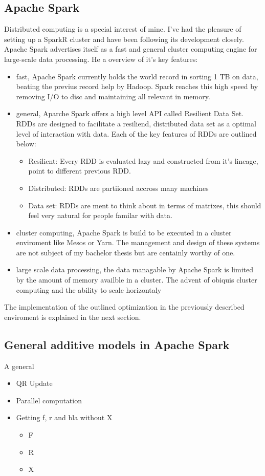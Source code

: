 \message{ !name(expose.tex)}\documentclass{article}
\begin{document}
    \subsection{Apache Spark}
    Distributed computing is a special interest of mine. I've had the pleasure of setting up a SparkR cluster and have been following its development closely. Apache Spark advertises itself as a fast and general cluster computing engine for large-scale data processing. He a overview of it's key features:
    \begin{itemize}
        \item fast, Apache Spark currently holds the world record in sorting 1 TB on data, beating the previus record help by Hadoop. Spark reaches this high speed by removing I/O to disc and maintaining all relevant in memory.
        \item general, Aparche Spark offers a high level API called Resilient Data Set. RDDs are designed to facilitate a resiliend, distributed data set as a optimal level of interaction with data. Each of the key features of RDDs are outlined below:
        \begin{itemize}
            \item Resilient: Every RDD is evaluated lazy and constructed from it's lineage, point to different previous RDD.
            \item Distributed: RDDs are partiioned accross many machines
            \item Data set: RDDs are ment to think about in terms of matrixes, this should feel very natural for people familar with data.
        \end{itemize}
        \item cluster computing, Apache Spark is build to be executed in a cluster enviroment like Mesos or Yarn. The management and design of these systems are not subject of my bachelor thesis but are centainly worthy of one.
        \item large scale data processing, the data managable by Apache Spark is limited by the amount of memory availble in a cluster. The advent of obiquis cluster computing and the ability to scale horizontaly
    \end{itemize} The implementation of the outlined optimization in the previously described enviroment is explained in the next section.

    \subsection{General additive models in Apache Spark}
    A general
    \begin{itemize}
        \item QR Update
        \item Parallel computation
        \item Getting f, r and bla without X
        \begin{itemize}
            \item F
            \item R
            \item X
        \end{itemize}
    \end{itemize}
\end{document}
